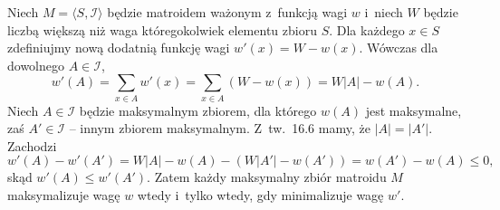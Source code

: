 \exercise %
Niech $M=\langle S,\mathcal{I}\rangle$ będzie matroidem ważonym z~funkcją wagi $w$ i~niech $W$ będzie liczbą większą niż waga któregokolwiek elementu zbioru $S$.
Dla każdego $x\in S$ zdefiniujmy nową dodatnią funkcję wagi $w'(x)=W-w(x)$.
Wówczas dla dowolnego $A\in\mathcal{I}$,
\[
	w'(A) = \sum_{x\in A}w'(x) = \sum_{x\in A}(W-w(x)) = W|A|-w(A).
\]
Niech $A\in\mathcal{I}$ będzie maksymalnym zbiorem, dla którego $w(A)$ jest maksymalne, zaś $A'\in\mathcal{I}$ -- innym zbiorem maksymalnym.
Z~tw.\ 16.6 mamy, że $|A|=|A'|$.
Zachodzi
\[
	w'(A)-w'(A') = W|A|-w(A)-(W|A'|-w(A')) = w(A')-w(A) \le 0,
\]
skąd $w'(A)\le w'(A')$.
Zatem każdy maksymalny zbiór matroidu $M$ maksymalizuje wagę $w$ wtedy i~tylko wtedy, gdy minimalizuje wagę $w'$.
